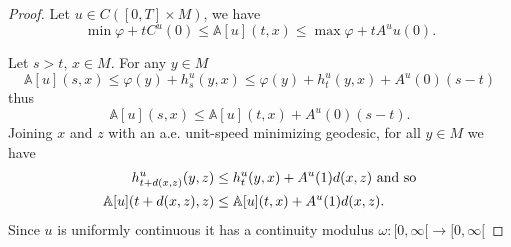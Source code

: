 \documentclass[12pt]{amsart}
\theoremstyle{plain}
\theoremstyle{definition}
\newcommand{\A}{\mathbb A}
\newcommand{\fui}{\varphi}
\newcommand{\om}{\omega}
\begin{document}
\begin{proof} Let $u\in C([0,T]\times M)$, we have
  \[\min\fui+tC^u(0)\le\A[u](t,x)\le \max\fui+tA^uu(0).\]
  
Let $s>t$, $x\in M$. For any $y\in M$
\[\A[u](s,x)\le\fui(y)+h^u_s(y,x)\le \fui(y)+h^u_t(y,x)+A^u(0)(s-t)\]
thus
\begin{equation}
  \label{eq:s,t}
  \A[u](s,x)\le \A[u](t,x) +A^u(0)(s-t).
  \end{equation}
Joining $x$ and $z$ with an a.e. unit-speed minimizing geodesic, for
all $y\in M$ we have
\begin{align}\nonumber
  h^u_{t+d(x,z)}(y,z)&\le h^u_t(y,x)+A^u(1)d(x,z)\hbox{ and so}\\
  \A[u](t+d(x,z),z)&\le\A[u](t,x)+A^u(1)d(x,z). \label{t+d}
\end{align}                     
Since $u$ is uniformly continuous it has a continuity modulus
$\om:[0,\infty[\to[0,\infty[$


\end{proof}
\end{document}
